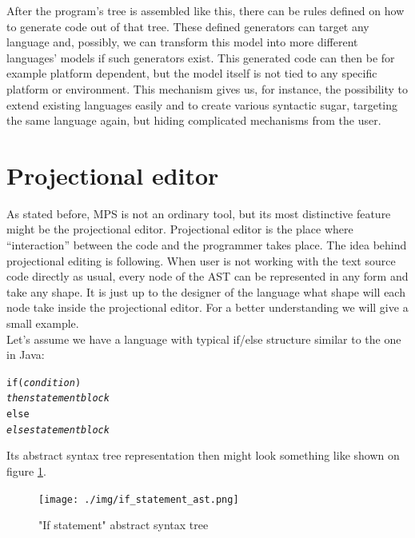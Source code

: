 After the program's tree is assembled like this, there can be rules defined on how to generate code out of that tree.
These defined generators can target any language and, possibly, we can transform this model into more different languages' models if such generators exist.
This generated code can then be for example platform dependent, but the model itself is not tied to any specific platform or environment.
This mechanism gives us, for instance, the possibility to extend existing languages easily and to create various syntactic sugar, targeting the same language again, but hiding complicated mechanisms from the user.

\section{Projectional editor}
As stated before, MPS is not an ordinary tool, but its most distinctive feature might be the projectional editor.
Projectional editor is the place where “interaction” between the code and the programmer takes place.
The idea behind projectional editing is following. When user is not working with the text source code directly as usual, every node of the AST can be represented in any form and take any shape.
It is just up to the designer of the language what shape will each node take inside the projectional editor.
For a better understanding we will give a small example.
\\

Let's assume we have a language with typical if/else structure similar to the one in Java:

\begin{center}
	\begin{minipage}{.38\textwidth}
		\begin{alltt}
			if (\textit{condition})
			    \textit{then statement block}
			else
			    \textit{else statement block}
		\end{alltt}
	\end{minipage}
\end{center}

\vspace{3mm}

Its abstract syntax tree representation then might look something like shown on figure \ref{fig:if_ast}.
\\

\begin{figure}[h]
	\centering
	\texttt{[image: ./img/if\_statement\_ast.png]}
	\caption{"If statement" abstract syntax tree}
	\label{fig:if_ast}
\end{figure}

